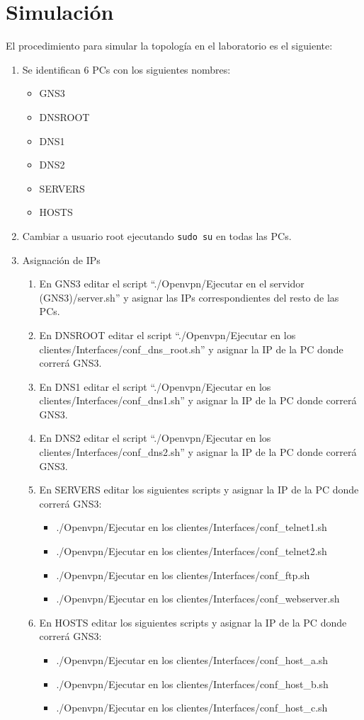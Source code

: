 \documentclass[12pt, a4paper, spanish]{article}
\begin{document}
\newpage
\section{Simulación}
El procedimiento para simular la topología en el laboratorio es el siguiente:

\begin{enumerate}
\item Se identifican 6 PCs con los siguientes nombres:
	\begin{itemize}
	\item GNS3
	\item DNSROOT
	\item DNS1
	\item DNS2
	\item SERVERS
	\item HOSTS
	\end{itemize}
	
\item Cambiar a usuario root ejecutando \texttt{sudo su} en todas las PCs.

\item Asignación de IPs
	\begin{enumerate}
	\item En GNS3 editar el script 
		``./Openvpn/Ejecutar en el servidor (GNS3)/server.sh'' y asignar las IPs 
		correspondientes del resto de las PCs.
	\item En DNSROOT editar el script 
		``./Openvpn/Ejecutar en los clientes/Interfaces/conf\_dns\_root.sh'' y 
		asignar la IP de la PC donde correrá GNS3.
	\item En DNS1 editar el script 
		``./Openvpn/Ejecutar en los clientes/Interfaces/conf\_dns1.sh'' y asignar la 
		IP de la PC donde correrá GNS3.
	\item En DNS2 editar el script 
		``./Openvpn/Ejecutar en los clientes/Interfaces/conf\_dns2.sh'' y asignar la 
		IP de la PC donde correrá GNS3.
	\item En SERVERS editar los siguientes scripts y asignar la IP de la PC donde 
		correrá GNS3:
		\begin{itemize}
		\item ./Openvpn/Ejecutar en los clientes/Interfaces/conf\_telnet1.sh
		\item ./Openvpn/Ejecutar en los clientes/Interfaces/conf\_telnet2.sh
		\item ./Openvpn/Ejecutar en los clientes/Interfaces/conf\_ftp.sh
		\item ./Openvpn/Ejecutar en los clientes/Interfaces/conf\_webserver.sh
		\end{itemize}
	\item En HOSTS editar los siguientes scripts y asignar la IP de la PC donde 
		correrá GNS3:
		\begin{itemize}
		\item ./Openvpn/Ejecutar en los clientes/Interfaces/conf\_host\_a.sh
		\item ./Openvpn/Ejecutar en los clientes/Interfaces/conf\_host\_b.sh
		\item ./Openvpn/Ejecutar en los clientes/Interfaces/conf\_host\_c.sh
		\end{itemize}
	\end{enumerate}
	

\end{enumerate}
\end{document}
